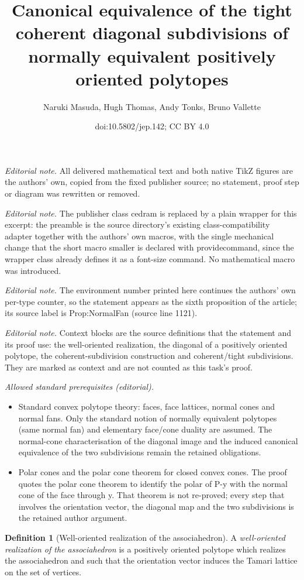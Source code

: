 \documentclass[10pt,a4paper]{amsart}
\title{Canonical equivalence of the tight coherent diagonal subdivisions of normally equivalent positively oriented polytopes}
\author{Naruki Masuda, Hugh Thomas, Andy Tonks, Bruno Vallette}
\date{doi:10.5802/jep.142; CC BY 4.0}
\numberwithin{equation}{section}\providecommand{\No}{}
\theoremstyle{plain}
\theoremstyle{definition}
\newtheorem{definition}{Definition}
\begin{document}
\maketitle
\setcounter{proposition}{5}
\noindent\textit{Editorial note.} All delivered mathematical text and both native TikZ figures are the authors' own, copied from the fixed publisher source; no statement, proof step or diagram was rewritten or removed.\par\medskip
\noindent\textit{Editorial note.} The publisher class cedram is replaced by a plain wrapper for this excerpt: the preamble is the source directory's existing class-compatibility adapter together with the authors' own macros, with the single mechanical change that the short macro smaller is declared with providecommand, since the wrapper class already defines it as a font-size command. No mathematical macro was introduced.\par\medskip
\noindent\textit{Editorial note.} The environment number printed here continues the authors' own per-type counter, so the statement appears as the sixth proposition of the article; its source label is Prop:NormalFan (source line 1121).\par\medskip
\noindent\textit{Editorial note.} Context blocks are the source definitions that the statement and its proof use: the well-oriented realization, the diagonal of a positively oriented polytope, the coherent-subdivision construction and coherent/tight subdivisions. They are marked as context and are not counted as this task's proof.\par\medskip
\noindent\textit{Allowed standard prerequisites (editorial).}\begin{itemize}
\item Standard convex polytope theory: faces, face lattices, normal cones and normal fans. Only the standard notion of normally equivalent polytopes (same normal fan) and elementary face/cone duality are assumed. The normal-cone characterisation of the diagonal image and the induced canonical equivalence of the two subdivisions remain the retained obligations.
\item Polar cones and the polar cone theorem for closed convex cones. The proof quotes the polar cone theorem to identify the polar of P-y with the normal cone of the face through y. That theorem is not re-proved; every step that involves the orientation vector, the diagonal map and the two subdivisions is the retained author argument.
\end{itemize}\medskip
\begin{definition}[Well-oriented realization of the associahedron]
A \emph{well-oriented reali\-zation of the associahedron} is a positively oriented polytope which realizes the associahedron and such that the orientation vector induces the Tamari lattice on the set of vertices.
\end{definition}
\end{document}
